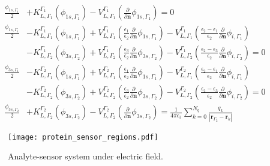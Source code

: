 \begin{widetext}
\begin{align} \label{eq:integral_eq_lspr_system}
\frac{\phi_{1s,\Gamma_1}}{2}&+ K_{L,\Gamma_1}^{\Gamma_1}(\phi_{1s,\Gamma_1}) - V_{L,\Gamma_1}^{\Gamma_1} \left(\frac{\partial}{\partial \mathbf{n}}\phi_{1s,\Gamma_1} \right) = 0  \nonumber \\
 \frac{\phi_{1s,\Gamma_1}}{2}& - K_{L,\Gamma_1}^{\Gamma_1}(\phi_{1s,\Gamma_1}) + V_{L,\Gamma_1}^{\Gamma_1} \left(\frac{\epsilon_1}{\epsilon_2}\frac{\partial}{\partial \mathbf{n}}\phi_{1s,\Gamma_1} \right) - V_{L,\Gamma_1}^{\Gamma_1} \left(\frac{\epsilon_2-\epsilon_1}{\epsilon_2}\frac{\partial}{\partial \mathbf{n}}\phi_{i,\Gamma_1} \right) \nonumber\\ 
 & - K_{L,\Gamma_2}^{\Gamma_1}(\phi_{3s,\Gamma_2}) + V_{L,\Gamma_2}^{\Gamma_1} \left(\frac{\epsilon_3}{\epsilon_2}\frac{\partial}{\partial \mathbf{n}}\phi_{3s,\Gamma_2} \right)  - V_{L,\Gamma_2}^{\Gamma_1} \left(\frac{\epsilon_2 -\epsilon_3}{\epsilon_2}\frac{\partial}{\partial \mathbf{n}}\phi_{i,\Gamma_2} \right) = 0   \nonumber \\
 \frac{\phi_{3s,\Gamma_1}}{2}& - K_{L,\Gamma_1}^{\Gamma_2}(\phi_{1s,\Gamma_1}) + V_{L,\Gamma_1}^{\Gamma_2} \left(\frac{\epsilon_1}{\epsilon_2}\frac{\partial}{\partial \mathbf{n}}\phi_{1s,\Gamma_1} \right) - V_{L,\Gamma_1}^{\Gamma_2} \left(\frac{\epsilon_2-\epsilon_1}{\epsilon_2}\frac{\partial}{\partial \mathbf{n}}\phi_{i,\Gamma_1} \right) \nonumber \\
& - K_{L,\Gamma_2}^{\Gamma_2}(\phi_{3s,\Gamma_2}) + V_{L,\Gamma_2}^{\Gamma_2} \left(\frac{\epsilon_3}{\epsilon_2}\frac{\partial}{\partial \mathbf{n}}\phi_{3s,\Gamma_2} \right)  - V_{L,\Gamma_2}^{\Gamma_2} \left(\frac{\epsilon_2 -\epsilon_3}{\epsilon_2}\frac{\partial}{\partial \mathbf{n}}\phi_{i,\Gamma_2} \right) = 0  \nonumber \\
\frac{\phi_{3s,\Gamma_2}}{2}& + K_{L,\Gamma_2}^{\Gamma_2}(\phi_{3s,\Gamma_2}) - V_{L,\Gamma_2}^{\Gamma_2} \left( \frac{\partial}{\partial \mathbf{n}} \phi_{3s,\Gamma_2} \right) = \frac{1}{4\pi\epsilon_3} \sum_{k=0}^{N_q} \frac{q_k}{|\mathbf{r}_{\Gamma_2} - \mathbf{r}_k|} 
\end{align}
\end{widetext}


\begin{figure}%
    \centering
    \texttt{[image: protein\_sensor\_regions.pdf]} 
    \caption{Analyte-sensor system under electric field.}
    \label{fig:analyte-sensor}
 \end{figure}


